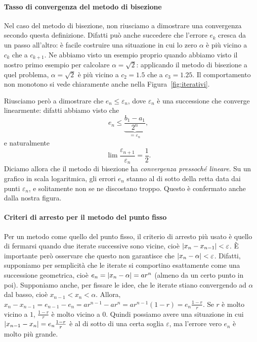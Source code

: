 \documentclass[a4paper]{report}
\DeclarePairedDelimiter{\abs}{\lvert}{\rvert}
\theoremstyle{definiton}
\theoremstyle{remark}
\begin{document}
\paragraph{Tasso di convergenza del metodo di bisezione}

Nel caso del metodo di bisezione, non riusciamo a dimostrare una convergenza secondo questa definizione. Difatti può anche succedere che l'errore $e_k$ cresca da un passo all'altro: è facile costruire una situazione in cui lo zero $\alpha$ è più vicino a $c_k$ che a $c_{k+1}$. Ne abbiamo visto un esempio proprio quando abbiamo visto il nostro primo esempio per calcolare $\alpha=\sqrt{2}$: applicando il metodo di bisezione a quel problema, $\alpha=\sqrt{2}$ è più vicino a $c_2=1.5$ che a $c_3=1.25$. Il comportamento non monotono si vede chiaramente anche nella Figura~\ref{fig:iterativi}.

Riusciamo però a dimostrare che $e_n \leq \varepsilon_n$, dove $\varepsilon_n$ è una successione che converge linearmente: difatti abbiamo visto che
\[
e_n \leq \underbrace{\frac{b_1 - a_1}{2^n}}_{=\varepsilon_n},
\]
e naturalmente
\[
\lim \frac{\varepsilon_{n+1}}{\varepsilon_n} = \frac{1}{2}.
\]
Diciamo allora che il metodo di bisezione ha \emph{convergenza pressoché lineare}. Su un grafico in scala logaritmica, gli errori $e_n$ stanno al di sotto della retta data dai punti $\varepsilon_n$, e solitamente non se ne discostano troppo. Questo è confermato anche dalla nostra figura.

\paragraph{Criteri di arresto per il metodo del punto fisso}

Per un metodo come quello del punto fisso, il criterio di arresto più usato è quello di fermarsi quando due iterate successive sono vicine, cioè $\abs{x_{n} - x_{n-1}} < \varepsilon$. È importante però osservare che questo non garantisce che $\abs{x_n - \alpha} < \varepsilon$. Difatti, supponiamo per semplicità che le iterate si comportino esattamente come una successione geometrica, cioè $e_n = \abs{x_n-\alpha} = ar^n$ (almeno da un certo punto in poi). Supponiamo anche, per fissare le idee, che le iterate stiano convergendo ad $\alpha$ dal basso, cioè $x_{n-1} < x_{n} < \alpha$. Allora, $x_{n} - x_{n-1} = e_{n-1} - e_n = ar^{n-1} - ar^n = ar^{n-1}(1-r) = e_n \frac{1-r}{r}$. Se $r$ è molto vicino a $1$, $\frac{1-r}{r}$ è molto vicino a $0$. Quindi possiamo avere una situazione in cui $\abs{x_{n-1}-x_n} = e_n \frac{1-r}{r}$ è al di sotto di una certa soglia $\varepsilon$, ma l'errore vero $e_n$ è molto più grande.
\end{document}
